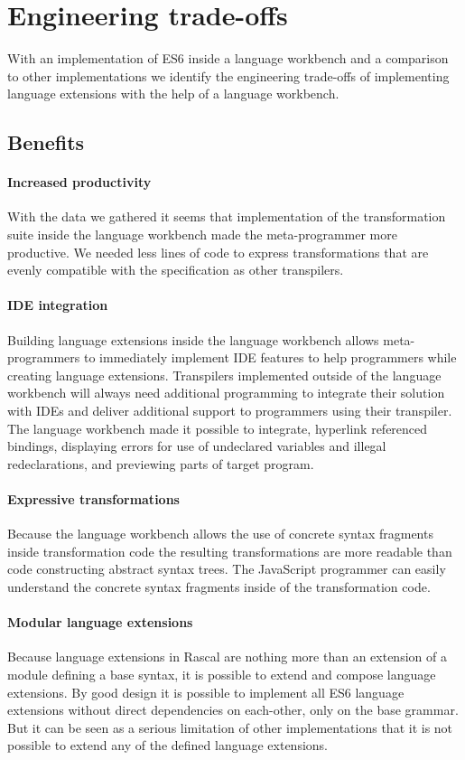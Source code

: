 \section{Engineering trade-offs}

With an implementation of ES6 inside a language workbench and a comparison to other implementations we identify the engineering trade-offs of implementing language extensions with the help of a language workbench.

\subsection{Benefits}

\paragraph{Increased productivity}
With the data we gathered it seems that implementation of the transformation suite inside the language workbench made the meta-programmer more productive. We needed less lines of code to express transformations that are evenly compatible with the specification as other transpilers. 

\paragraph{IDE integration}
Building language extensions inside the language workbench allows meta-programmers to immediately implement IDE features to help programmers while creating language extensions. Transpilers implemented outside of the language workbench will always need additional programming to integrate their solution with IDEs and deliver additional support to programmers using their transpiler. The language workbench made it possible to integrate, hyperlink referenced bindings, displaying errors for use of undeclared variables and illegal redeclarations, and previewing parts of target program. 

\paragraph{Expressive transformations}
Because the language workbench allows the use of concrete syntax fragments inside transformation code the resulting transformations are more readable than code constructing abstract syntax trees. The JavaScript programmer can easily understand the concrete syntax fragments inside of the transformation code.

\paragraph{Modular language extensions}
Because language extensions in Rascal are nothing more than an extension of a module defining a base syntax, it is possible to extend and compose language extensions. By good design it is possible to implement all ES6 language extensions without direct dependencies on each-other, only on the base grammar. But it can be seen as a serious limitation of other implementations that it is not possible to extend any of the defined language extensions. 


